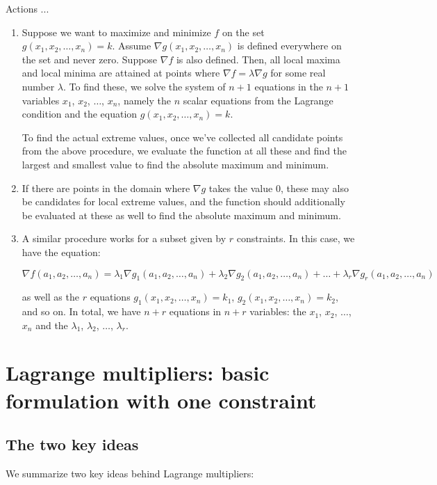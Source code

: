 \documentclass[10pt]{amsart}
\begin{document}
Actions ...

\begin{enumerate}
\item Suppose we want to maximize and minimize $f$ on the set
  $g(x_1,x_2,\dots,x_n) = k$. Assume $\nabla g(x_1,x_2,\dots,x_n)$ is
  defined everywhere on the set and never zero. Suppose $\nabla f$ is
  also defined. Then, all local maxima and local minima are attained
  at points where $\nabla f = \lambda \nabla g$ for some real number
  $\lambda$. To find these, we solve the system of $n + 1$ equations
  in the $n+1$ variables $x_1$, $x_2$, $\dots$, $x_n$, namely the $n$
  scalar equations from the Lagrange condition and the equation
  $g(x_1,x_2,\dots,x_n) = k$.

  To find the actual extreme values, once we've collected all
  candidate points from the above procedure, we evaluate the function
  at all these and find the largest and smallest value to find the
  absolute maximum and minimum.

\item If there are points in the domain where $\nabla g$ takes the
  value $0$, these may also be candidates for local extreme values,
  and the function should additionally be evaluated at these as well
  to find the absolute maximum and minimum.
\item A similar procedure works for a subset given by $r$
  constraints. In this case, we have the equation:

  $$\nabla f(a_1,a_2,\dots,a_n) = \lambda_1\nabla g_1(a_1,a_2,\dots,a_n) + \lambda_2\nabla g_2(a_1,a_2,\dots,a_n) + \dots + \lambda_r\nabla g_r(a_1,a_2,\dots,a_n)$$

  as well as the $r$ equations $g_1(x_1,x_2,\dots,x_n) = k_1$,
  $g_2(x_1,x_2,\dots,x_n) = k_2$, and so on. In total, we have
  $n + r$ equations in $n + r$ variables: the $x_1$, $x_2$, $\dots$,
  $x_n$ and the $\lambda_1$, $\lambda_2$, $\dots$, $\lambda_r$.
\end{enumerate}
\section{Lagrange multipliers: basic formulation with one constraint}

\subsection{The two key ideas}

We summarize two key ideas behind Lagrange multipliers:
\end{document}
